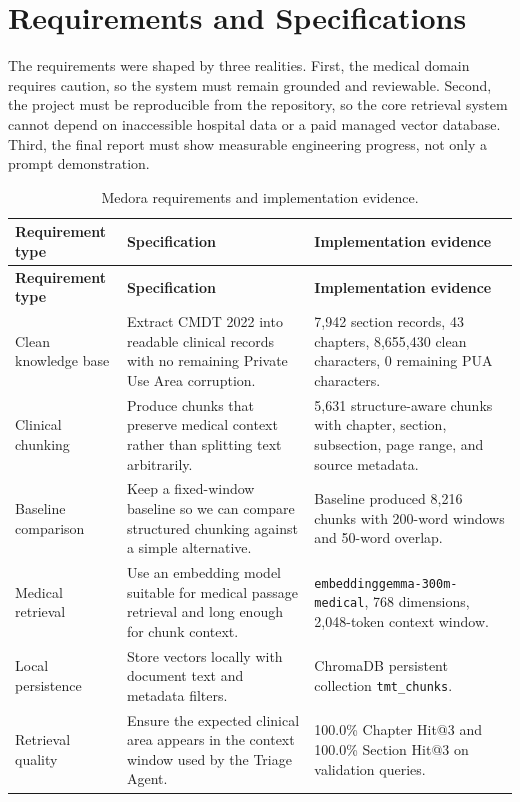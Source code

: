 \section{Requirements and Specifications}

The requirements were shaped by three realities. First, the medical domain requires caution, so the system must remain grounded and reviewable. Second, the project must be reproducible from the repository, so the core retrieval system cannot depend on inaccessible hospital data or a paid managed vector database. Third, the final report must show measurable engineering progress, not only a prompt demonstration.

\begin{longtable}{p{} p{} p{}}
\caption{Medora requirements and implementation evidence.}
\label{tab:requirements}\\
\toprule
\textbf{Requirement type} & \textbf{Specification} & \textbf{Implementation evidence}\\
\midrule
\endfirsthead
\toprule
\textbf{Requirement type} & \textbf{Specification} & \textbf{Implementation evidence}\\
\midrule
\endhead
Clean knowledge base & Extract CMDT 2022 into readable clinical records with no remaining Private Use Area corruption. & 7,942 section records, 43 chapters, 8,655,430 clean characters, 0 remaining PUA characters.\\
Clinical chunking & Produce chunks that preserve medical context rather than splitting text arbitrarily. & 5,631 structure-aware chunks with chapter, section, subsection, page range, and source metadata.\\
Baseline comparison & Keep a fixed-window baseline so we can compare structured chunking against a simple alternative. & Baseline produced 8,216 chunks with 200-word windows and 50-word overlap.\\
Medical retrieval & Use an embedding model suitable for medical passage retrieval and long enough for chunk context. & \texttt{embeddinggemma-300m-medical}, 768 dimensions, 2,048-token context window.\\
Local persistence & Store vectors locally with document text and metadata filters. & ChromaDB persistent collection \texttt{tmt\_chunks}.\\
Retrieval quality & Ensure the expected clinical area appears in the context window used by the Triage Agent. & 100.0\% Chapter Hit@3 and 100.0\% Section Hit@3 on validation queries.\\

\end{longtable}
